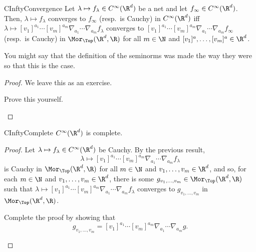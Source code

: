 \begin{prp}{}{CInftyConvergence}
Let $\lambda \mapsto f_\lambda \in C^{\infty}(\R ^d)$ be a net and let $f_\infty \in C^{\infty}(\R ^d)$.  Then, $\lambda \mapsto f_\lambda$ converges to $f_\infty$ (resp.~is Cauchy) in $C^{\infty}(\R ^d)$ iff $\lambda \mapsto [v_1]^{a_1}\cdots [v_m]^{a_m}\nabla _{a_1}\cdots \nabla _{a_m}f_\lambda$ converges to $[v_1]^{a_1}\cdots [v_m]^{a_m}\nabla _{a_1}\cdots \nabla _{a_m}f_\infty$ (resp.~is Cauchy) in $\Mor _{
\Top}(\R ^d,\R )$ for all $m\in \N$ and $[v_1]^a,\ldots ,[v_m]^a\in \R ^d$.
\begin{rmk}
You might say that the definition of the seminorms was made the way they were so that this is the case.
\end{rmk}
\begin{proof}
We leave this as an exercise.
\begin{exr}[breakable=false]{}{}
Prove this yourself.
\end{exr}
\end{proof}
\end{prp}
\begin{thm}{}{CInftyComplete}
$C^{\infty}(\R ^d)$ is complete.
\begin{proof}
Let $\lambda \mapsto f_\lambda \in C^{\infty}(\R ^d)$ be Cauchy.  By the previous result,
\begin{equation}
\lambda \mapsto [v_1]^{a_1}\cdots [v_m]^{a_m}\nabla _{a_1}\cdots \nabla _{a_m}f_\lambda
\end{equation}
is Cauchy in $\Mor _{\Top}(\R ^d,\R )$ for all $m\in \N$ and $v_1,\ldots ,v_m\in \R ^d$, and so, for each $m\in \N$ and $v_1,\ldots ,v_m\in \R ^d$, there is some $g_{v_1,\ldots ,v_m}\in \Mor _{\Top}(\R ^d,\R )$ such that $\lambda \mapsto [v_1]^{a_1}\cdots [v_m]^{a_m}\nabla _{a_1}\cdots \nabla _{a_m}f_\lambda$ converges to $g_{v_1,\ldots ,v_m}$ in $\Mor _{\Top}(\R ^d,\R )$.
\begin{exr}[breakable=false]{}{}
Complete the proof by showing that
\begin{equation}
g_{v_1,\ldots ,v_m}=[v_1]^{a_1}\cdots [v_m]^{a_m}\nabla _{a_1}\cdots \nabla _{a_m}g.
\end{equation}
\end{exr}
\end{proof}
\end{thm}

